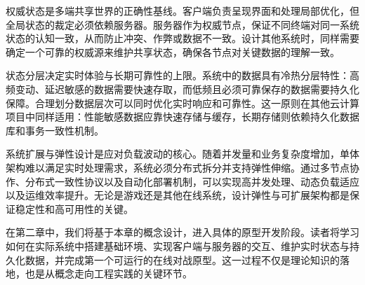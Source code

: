 权威状态是多端共享世界的正确性基线。客户端负责呈现界面和处理局部优化，但全局状态的裁定必须依赖服务器。服务器作为权威节点，保证不同终端对同一系统状态的认知一致，从而防止冲突、作弊或数据不一致。设计其他系统时，同样需要确定一个可靠的权威源来维护共享状态，确保各节点对关键数据的理解一致。

状态分层决定实时体验与长期可靠性的上限。系统中的数据具有冷热分层特性：高频变动、延迟敏感的数据需要快速存取，而低频且必须可靠保存的数据需要持久化保障。合理划分数据层次可以同时优化实时响应和可靠性。这一原则在其他云计算项目中同样适用：性能敏感数据应靠快速存储与缓存，长期存储则依赖持久化数据库和事务一致性机制。

系统扩展与弹性设计是应对负载波动的核心。随着并发量和业务复杂度增加，单体架构难以满足实时处理需求，系统必须分布式拆分并支持弹性伸缩。通过多节点协作、分布式一致性协议以及自动化部署机制，可以实现高并发处理、动态负载适应以及运维效率提升。无论是游戏还是其他在线系统，设计弹性与可扩展架构都是保证稳定性和高可用性的关键。

在第二章中，我们将基于本章的概念设计，进入具体的原型开发阶段。读者将学习如何在实际系统中搭建基础环境、实现客户端与服务器的交互、维护实时状态与持久化数据，并完成第一个可运行的在线对战原型。这一过程不仅是理论知识的落地，也是从概念走向工程实践的关键环节。
\newpage
